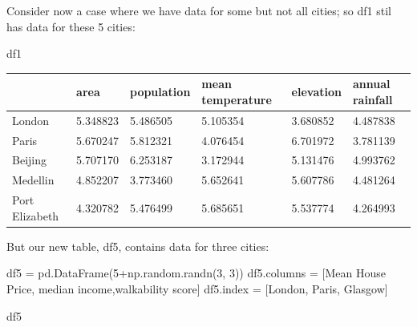 \documentclass[
  letterpaper,
  DIV=11,
  numbers=noendperiod]{scrreprt}
\newenvironment{Shaded}{\begin{snugshade}}{\end{snugshade}}
\newcommand{\DecValTok}[1]{\textcolor[rgb]{0.68,0.00,0.00}{#1}}
\newcommand{\NormalTok}[1]{\textcolor[rgb]{0.00,0.23,0.31}{#1}}
\newcommand{\OperatorTok}[1]{\textcolor[rgb]{0.37,0.37,0.37}{#1}}
\newcommand{\StringTok}[1]{\textcolor[rgb]{0.13,0.47,0.30}{#1}}
\begin{document}
Consider now a case where we have data for some but not all cities; so
df1 stil has data for these 5 cities:

\begin{Shaded}
\begin{Highlighting}[]
\NormalTok{df1}
\end{Highlighting}
\end{Shaded}

\begin{longtable}[]{@{}llllll@{}}
\toprule()
& area & population & mean temperature & elevation & annual rainfall \\
\midrule()
\endhead
London & 5.348823 & 5.486505 & 5.105354 & 3.680852 & 4.487838 \\
Paris & 5.670247 & 5.812321 & 4.076454 & 6.701972 & 3.781139 \\
Beijing & 5.707170 & 6.253187 & 3.172944 & 5.131476 & 4.993762 \\
Medellin & 4.852207 & 3.773460 & 5.652641 & 5.607786 & 4.481264 \\
Port Elizabeth & 4.320782 & 5.476499 & 5.685651 & 5.537774 & 4.264993 \\
\bottomrule()
\end{longtable}

But our new table, df5, contains data for three cities:

\begin{Shaded}
\begin{Highlighting}[]
\NormalTok{df5 }\OperatorTok{=}\NormalTok{ pd.DataFrame(}\DecValTok{5}\OperatorTok{+}\NormalTok{np.random.randn(}\DecValTok{3}\NormalTok{, }\DecValTok{3}\NormalTok{))}
\NormalTok{df5.columns }\OperatorTok{=}\NormalTok{ [}\StringTok{\textquotesingle{}Mean House Price\textquotesingle{}}\NormalTok{, }\StringTok{\textquotesingle{}median income\textquotesingle{}}\NormalTok{,}\StringTok{\textquotesingle{}walkability score\textquotesingle{}}\NormalTok{]}
\NormalTok{df5.index }\OperatorTok{=}\NormalTok{ [}\StringTok{\textquotesingle{}London\textquotesingle{}}\NormalTok{, }\StringTok{\textquotesingle{}Paris\textquotesingle{}}\NormalTok{, }\StringTok{\textquotesingle{}Glasgow\textquotesingle{}}\NormalTok{]}
\end{Highlighting}
\end{Shaded}

\begin{Shaded}
\begin{Highlighting}[]
\NormalTok{df5}
\end{Highlighting}
\end{Shaded}
\end{document}

